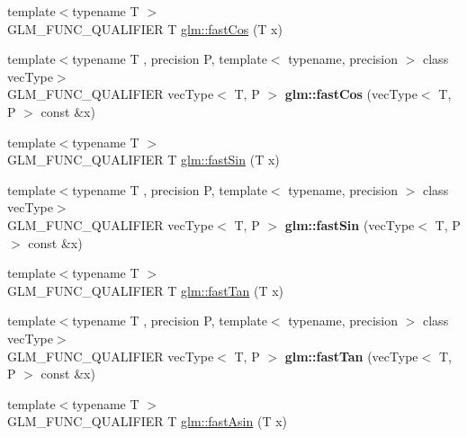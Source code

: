 \begin{DoxyCompactItemize}
\item 
{\footnotesize template$<$typename T $>$ }\\G\+L\+M\+\_\+\+F\+U\+N\+C\+\_\+\+Q\+U\+A\+L\+I\+F\+I\+ER T \hyperlink{group__gtx__fast__trigonometry_gab34c8b45c23c0165a64dcecfcc3b302a}{glm\+::fast\+Cos} (T x)
\item 
\mbox{\label{fast__trigonometry_8inl_a6a378691e2e5a984d2ad9b256c87961b}} 
{\footnotesize template$<$typename T , precision P, template$<$ typename, precision $>$ class vec\+Type$>$ }\\G\+L\+M\+\_\+\+F\+U\+N\+C\+\_\+\+Q\+U\+A\+L\+I\+F\+I\+ER vec\+Type$<$ T, P $>$ {\bfseries glm\+::fast\+Cos} (vec\+Type$<$ T, P $>$ const \&x)
\item 
{\footnotesize template$<$typename T $>$ }\\G\+L\+M\+\_\+\+F\+U\+N\+C\+\_\+\+Q\+U\+A\+L\+I\+F\+I\+ER T \hyperlink{group__gtx__fast__trigonometry_ga0aab3257bb3b628d10a1e0483e2c6915}{glm\+::fast\+Sin} (T x)
\item 
\mbox{\label{fast__trigonometry_8inl_a80a1ff93a0918b400dfb41a7f8842974}} 
{\footnotesize template$<$typename T , precision P, template$<$ typename, precision $>$ class vec\+Type$>$ }\\G\+L\+M\+\_\+\+F\+U\+N\+C\+\_\+\+Q\+U\+A\+L\+I\+F\+I\+ER vec\+Type$<$ T, P $>$ {\bfseries glm\+::fast\+Sin} (vec\+Type$<$ T, P $>$ const \&x)
\item 
{\footnotesize template$<$typename T $>$ }\\G\+L\+M\+\_\+\+F\+U\+N\+C\+\_\+\+Q\+U\+A\+L\+I\+F\+I\+ER T \hyperlink{group__gtx__fast__trigonometry_gaf29b9c1101a10007b4f79ee89df27ba2}{glm\+::fast\+Tan} (T x)
\item 
\mbox{\label{fast__trigonometry_8inl_ab443760a1fea463f298e522fd11974dd}} 
{\footnotesize template$<$typename T , precision P, template$<$ typename, precision $>$ class vec\+Type$>$ }\\G\+L\+M\+\_\+\+F\+U\+N\+C\+\_\+\+Q\+U\+A\+L\+I\+F\+I\+ER vec\+Type$<$ T, P $>$ {\bfseries glm\+::fast\+Tan} (vec\+Type$<$ T, P $>$ const \&x)
\item 
{\footnotesize template$<$typename T $>$ }\\G\+L\+M\+\_\+\+F\+U\+N\+C\+\_\+\+Q\+U\+A\+L\+I\+F\+I\+ER T \hyperlink{group__gtx__fast__trigonometry_ga562cb62c51fbfe7fac7db0bce706b81f}{glm\+::fast\+Asin} (T x)

\end{DoxyCompactItemize}
